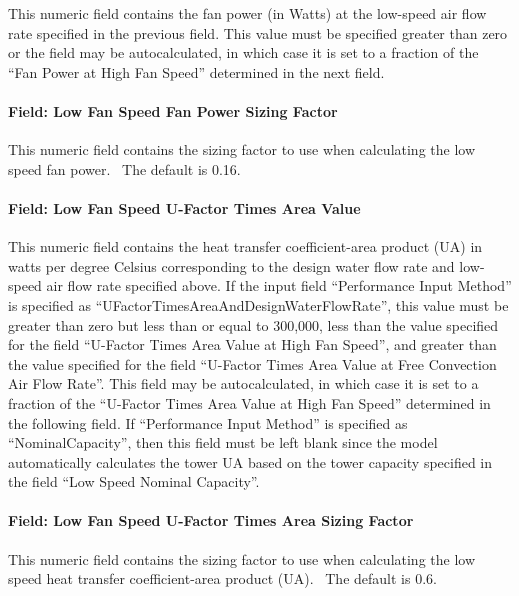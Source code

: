 This numeric field contains the fan power (in Watts) at the low-speed air flow rate specified in the previous field. This value must be specified greater than zero or the field may be autocalculated, in which case it is set to a fraction of the ``Fan Power at High Fan Speed'' determined in the next field.

\paragraph{Field: Low Fan Speed Fan Power Sizing Factor}\label{field-low-fan-speed-fan-power-sizing-factor}

This numeric field contains the sizing factor to use when calculating the low speed fan power.~ The default is 0.16.

\paragraph{Field: Low Fan Speed U-Factor Times Area Value}\label{field-low-fan-speed-u-factor-times-area-value}

This numeric field contains the heat transfer coefficient-area product (UA) in watts per degree Celsius corresponding to the design water flow rate and low-speed air flow rate specified above. If the input field ``Performance Input Method'' is specified as ``UFactorTimesAreaAndDesignWaterFlowRate'', this value must be greater than zero but less than or equal to 300,000, less than the value specified for the field ``U-Factor Times Area Value at High Fan Speed'', and greater than the value specified for the field ``U-Factor Times Area Value at Free Convection Air Flow Rate''. This field may be autocalculated, in which case it is set to a fraction of the ``U-Factor Times Area Value at High Fan Speed'' determined in the following field. If ``Performance Input Method'' is specified as ``NominalCapacity'', then this field must be left blank since the model automatically calculates the tower UA based on the tower capacity specified in the field ``Low Speed Nominal Capacity''.

\paragraph{Field: Low Fan Speed U-Factor Times Area Sizing Factor}\label{field-low-fan-speed-u-factor-times-area-sizing-factor}

This numeric field contains the sizing factor to use when calculating the low speed heat transfer coefficient-area product (UA).~ The default is 0.6.

